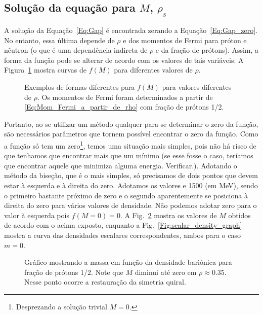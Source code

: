 \subsection{Solução da equação para $M$, $\rho_s$}

A solução da Equação~\eqref{Eq:Gap} é encontrada zerando a Equação~\eqref{Eq:Gap_zero}. No entanto, essa última depende de $\rho$ e dos momentos de Fermi para próton e nêutron (o que é uma dependência indireta de $\rho$ e da fração de prótons). Assim, a forma da função pode se alterar de acordo com os valores de tais variáveis. A Figura~\ref{Fig:Gap_zero_graph} mostra curvas de $f(M)$ para diferentes valores de $\rho$.

\begin{figure}
	
	\caption{Exemplos de formas diferentes para $f(M)$ para valores diferentes de $\rho$. Os momentos de Fermi foram determinados a partir de \eqref{Eq:Mom_Fermi_a_partir_de_rho} com fração de prótons 1/2. \protect}
	\label{Fig:Gap_zero_graph}
\end{figure}

Portanto, ao se utilizar um método qualquer para se determinar o zero da função, são necessários parâmetros que tornem possível encontrar o zero da função. Como a função só tem um zero\footnote[][1cm]{Desprezando a solução trivial $M = 0$.}, temos uma situação mais simples, pois não há risco de que tenhamos que encontrar mais que um mínimo (se esse fosse o caso, teríamos que encontrar aquele que minimiza alguma energia\cite{Buballa}. Verificar.). Adotando o método da biseção, que é o mais simples, só precisamos de dois pontos que devem estar à esquerda e à direita do zero. Adotamos os valores  e 1500 (em MeV), sendo o primeiro bastante próximo de zero e o segundo aparentemente se posiciona à direita do zero para vários valores de densidade. Não podemos adotar zero para o valor à esquerda pois $f(M=0) = 0$. A Fig.~\ref{Fig:mass_graph} mostra os valores de $M$ obtidos de acordo com o acima exposto, enquanto a Fig.~\ref{Fig:scalar_density_graph} mostra a curva das densidades escalares correspondentes, ambos para o caso $m = 0$.

\begin{figure}
	
	\caption{Gráfico mostrando a massa em função da densidade bariônica para fração de prótons 1/2. Note que $M$ diminui até zero em $\rho \approx 0.35$. Nesse ponto ocorre a restauração da simetria quiral. \protect}
	\label{Fig:mass_graph}
\end{figure}

